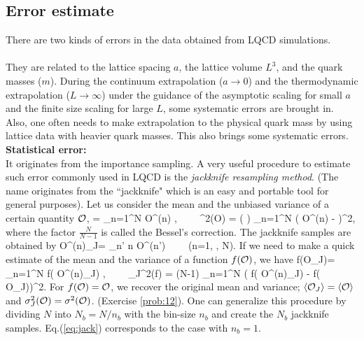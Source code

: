 \subsection{Error estimate}

There are two kinds of errors  in the data obtained from  LQCD simulations.\\

 \\
 They are related to the lattice spacing $a$, the lattice volume $L^3$,
  and the quark masses ($m$).  During 
  the continuum extrapolation ($a\rightarrow 0$) and the thermodynamic extrapolation ($L \rightarrow \infty$) 
  under the  guidance of  the asymptotic scaling for small $a$ 
 and the finite size scaling for  large $L$, some systematic errors are brought in.
 Also,  one often needs to make extrapolation to the physical quark mass by using 
 lattice data  with heavier  quark masses. This  also brings some
 systematic errors.\\
 
 \noindent
{\bf Statistical error:} \\
It originates from the importance sampling.  A very useful procedure to estimate such error
 commonly used in LQCD is the {\it jackknife resampling method}. (The name
  originates from the ``jackknife"  which is an easy and  portable  tool  for general purposes).
  Let us consider the mean and the unbiased variance of a certain quantity $ {\cal O}$,
  \beq
    \ra =  \sum_{n=1}^N {\cal O}^{(n)}  \pm {}, \ \ \ \
   \sigma^2({\cal O}) = \left(  \right)   \sum_{n=1}^N ( {\cal O}^{(n)}  -  \ra )^2,
  \eeq
where the factor $\frac{N}{N-1}$ is called the Bessel's correction.
 The jackknife samples are obtained by
 \beq
  {\cal O}^{(n)}_J=  \sum_{n' \neq n}  {\cal O}^{(n')}      \ \ \ \  (n=1, \cdots, N).
 \eeq
 If we need to make a quick estimate of the 
  mean and the variance of a function $f({\cal O})$, we have
 \beq
\label{eq:jack}
 \la f({\cal O}_J)\ra =  \sum_{n=1}^{N} f( {\cal O}^{(n)}_J) \pm  {}, \ \ \ \ 
  \sigma_J^2(f) = (N-1) \sum_{n=1}^N ( f( {\cal O}^{(n)}_J) -  \la f( {\cal O}_J)\ra)^2. 
\eeq
For $f( {\cal O})={\cal O}$, we recover the original  mean and variance;
 $\langle  {\cal O}_J \rangle = \langle  {\cal O} \rangle$ and  $\sigma_J^2({\cal O})=\sigma^2({\cal O})$. (Exercise \ref{prob:12}).
One can generalize this procedure by dividing $N$ into $N_b=N/n_b$  
with the bin-size $n_b$ and create the $N_b$ jackknife samples. 
 Eq.(\ref{eq:jack})  corresponds to the case with $n_b=1$.

